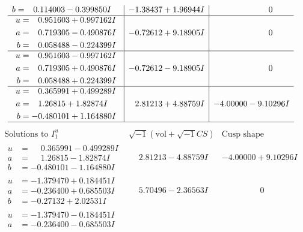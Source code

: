 \documentclass[1p]{elsarticle_modified}
\theoremstyle{definition}
\newcommand{\I}{\sqrt{-1}}
\begin{document}
$$\begin{array}{c|c|c}
\begin{aligned}
b &= \phantom{-}0.114003 - 0.399850 I\end{aligned}
 & -1.38437 + 1.96944 I & \phantom{-0.000000 } 0 \\ \hline\begin{aligned}
u &= \phantom{-}0.951603 + 0.997162 I \\
a &= \phantom{-}0.719305 - 0.490876 I \\
b &= \phantom{-}0.058488 - 0.224399 I\end{aligned}
 & -0.72612 + 9.18905 I & \phantom{-0.000000 } 0 \\ \hline\begin{aligned}
u &= \phantom{-}0.951603 - 0.997162 I \\
a &= \phantom{-}0.719305 + 0.490876 I \\
b &= \phantom{-}0.058488 + 0.224399 I\end{aligned}
 & -0.72612 - 9.18905 I & \phantom{-0.000000 } 0 \\ \hline\begin{aligned}
u &= \phantom{-}0.365991 + 0.499289 I \\
a &= \phantom{-}1.26815 + 1.82874 I \\
b &= -0.480101 + 1.164880 I\end{aligned}
 & \phantom{-}2.81213 + 4.88759 I & -4.00000 - 9.10296 I\\
 \hline 
 \end{array}$$\newpage$$\begin{array}{c|c|c}  
\text{Solutions to }I^u_{1}& \I (\text{vol} + \sqrt{-1}CS) & \text{Cusp shape}\\
 \hline 
\begin{aligned}
u &= \phantom{-}0.365991 - 0.499289 I \\
a &= \phantom{-}1.26815 - 1.82874 I \\
b &= -0.480101 - 1.164880 I\end{aligned}
 & \phantom{-}2.81213 - 4.88759 I & -4.00000 + 9.10296 I \\ \hline\begin{aligned}
u &= -1.379470 + 0.184451 I \\
a &= -0.236400 + 0.685503 I \\
b &= -0.27132 + 2.02531 I\end{aligned}
 & \phantom{-}5.70496 - 2.36563 I & \phantom{-0.000000 } 0 \\ \hline\begin{aligned}
u &= -1.379470 - 0.184451 I \\
a &= -0.236400 - 0.685503 I \\

\end{aligned}
\end{array}$$
\end{document}
